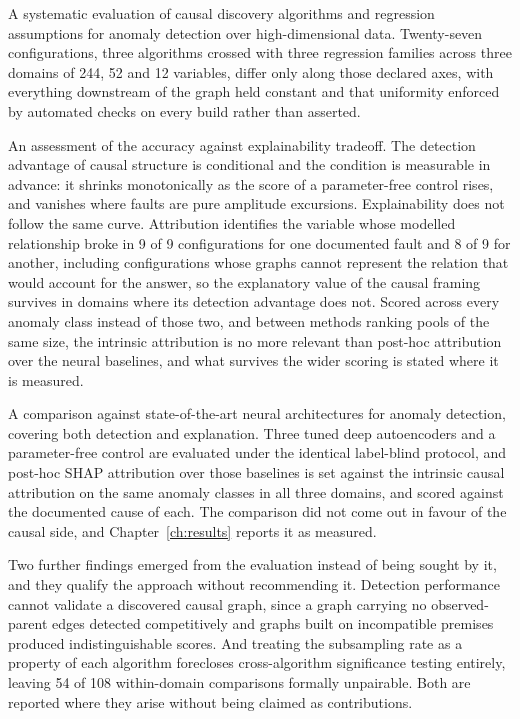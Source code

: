 \begin{description}[leftmargin=1.2cm,font=\bfseries]
  \item[C1] A systematic evaluation of causal discovery algorithms and regression assumptions for anomaly detection over high-dimensional data. Twenty-seven configurations, three algorithms crossed with three regression families across three domains of 244, 52 and 12 variables, differ only along those declared axes, with everything downstream of the graph held constant and that uniformity enforced by automated checks on every build rather than asserted.
  \item[C2] An assessment of the accuracy against explainability tradeoff. The detection advantage of causal structure is conditional and the condition is measurable in advance: it shrinks monotonically as the score of a parameter-free control rises, and vanishes where faults are pure amplitude excursions. Explainability does not follow the same curve. Attribution identifies the variable whose modelled relationship broke in 9 of 9 configurations for one documented fault and 8 of 9 for another, including configurations whose graphs cannot represent the relation that would account for the answer, so the explanatory value of the causal framing survives in domains where its detection advantage does not. Scored across every anomaly class instead of those two, and between methods ranking pools of the same size, the intrinsic attribution is no more relevant than post-hoc attribution over the neural baselines, and what survives the wider scoring is stated where it is measured.
  \item[C3] A comparison against state-of-the-art neural architectures for anomaly detection, covering both detection and explanation. Three tuned deep autoencoders and a parameter-free control are evaluated under the identical label-blind protocol, and post-hoc SHAP attribution over those baselines is set against the intrinsic causal attribution on the same anomaly classes in all three domains, and scored against the documented cause of each. The comparison did not come out in favour of the causal side, and Chapter~\ref{ch:results} reports it as measured.
\end{description}

Two further findings emerged from the evaluation instead of being sought by it, and they qualify the approach without recommending it. Detection performance cannot validate a discovered causal graph, since a graph carrying no observed-parent edges detected competitively and graphs built on incompatible premises produced indistinguishable scores. And treating the subsampling rate as a property of each algorithm forecloses cross-algorithm significance testing entirely, leaving 54 of 108 within-domain comparisons formally unpairable. Both are reported where they arise without being claimed as contributions.

